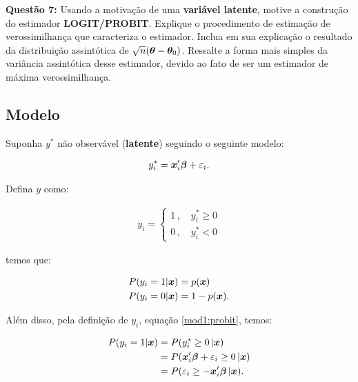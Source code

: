 \documentclass[11pt,oneside,a4paper]{article}
\numberwithin{equation}{section}
\begin{document}
\begin{description}
\begin{description}
\noindent
\textbf{Questão 7:}
Usando a motivação de uma \textbf{variável latente}, motive a construção do estimador \textbf{LOGIT/PROBIT}.
Explique o procedimento de estimação de verossimilhança que caracteriza o estimador.
Inclua em sua explicação o resultado da distribuição assintótica de 
$\sqrt{n}(\boldsymbol{ \theta } - \boldsymbol{\theta}_{0})$.
Ressalte a forma mais simples da variância assintótica desse estimador, devido ao fato de ser um estimador de máxima verossimilhança.

\subsection*{Modelo}

Suponha $y^{*}$ não observável (\textbf{latente}) seguindo o seguinte modelo:

\vspace{-1 em}
\begin{align} \label{mod1:probit}
	y_{i}^{*} = \boldsymbol{x}_{i}' \boldsymbol{\beta} + \varepsilon_{i}.
\end{align}

\noindent
Defina $y$ como:

\vspace{-1 em}
\begin{align*}
y_{i} =
\begin{cases}
	1 \, , \quad y^{*}_{i} \geq 0
\\
	0 \, , \quad y^{*}_{i} < 0
\end{cases}
\end{align*}

\noindent
temos que:

\vspace{-1 em}
\begin{align*}
	P( y_{i} = 1 | \boldsymbol{x} ) &= p( \boldsymbol{x} )
	\\
	P( y_{i} = 0 | \boldsymbol{x} ) &= 1 - p( \boldsymbol{x} ).
\end{align*}

Além disso, pela definição de $y_{i}$, equação \eqref{mod1:probit}, temos:

\vspace{-1 em}
\begin{align*}
	P( y_{i} = 1 | \boldsymbol{x} ) &= P(y_{i}^{*} \geq 0 \, | \boldsymbol{x} )
\\
&= P( \boldsymbol{x}_{i}' \boldsymbol{\beta} + \varepsilon_{i} \geq 0 \, | \boldsymbol{x} )
\\
&= P( \varepsilon_{i} \geq - \boldsymbol{x}_{i}' \boldsymbol{\beta}  \, | \boldsymbol{x} ).
\end{align*}


\end{description}
\end{description}
\end{document}
